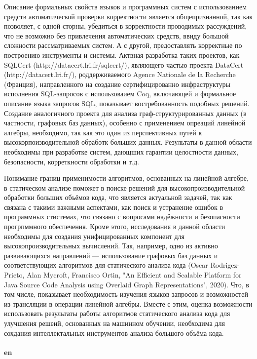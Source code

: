 \documentclass[12pt]{article}  %
\theoremstyle{remark}
\begin{document}
Описание формальных свойств языков и программных систем с использованием средств автоматической проверки корректности является общепризнанной, так как позволяет, с одной сторны, убедиться в корректности проводимых рассуждений, что не возможно без привлечения автоматических средств, ввиду большой сложности рассматриваемых систем. А с другой, предоставлять корректные по построению инструменты и системы. Актвная разработка таких проектов, как SQLCert (http://datacert.lri.fr/sqlcert/), являющего частью проекта DataCert (http://datacert.lri.fr/), роддерживаемого Agence Nationale de la Recherche (Франция), направленного на создание сертифицированно инфраструктуры исполнения SQL-запросов с использоваием Coq, включающей и формальное описание языка запросов SQL, показывает востребованность подобных решений. Создание аналогичного проекта для анализа граф-структурированных данных (в частности, графовых баз данных), особенно с применением опреаций линейной алгебры, необходимо, так как это один из перспективных путей к высокорпоизводительной обработк больших данных.
Результаты в данной области необходимы при разработке систем, дающших гарантии целостности данных, безопасности, корреткности обработки и т.д.

Понимание границ применимости алгоритмов, основанных на линейной алгебре, в статическом анализе поможет в поиске решений для высокопроизводительной обработки больших объёмов кода, что является актуальной задачей, так как связана с такими важными аспектами, как поиск и устранение ошибок в программных стистемах, что связано с вопросами надёжности и безопасности прогрпммного обеспечения. Кроме этого, исследования в данной области необходимы для создания унифицированных компонент для высокопроизводительных вычислений. Так, например, одно из активно развивающихся направлений --- использование графовых баз данных и соответствующих алгоритмов для статического анализа кода (Oscar Rodrigez-Prieto, Alan Mycroft, Francisco Ortin, "An Efficient and Scalable Platform for Java Source Code Analysis using Overlaid Graph Representations", 2020). Что, в том числе, показывает необходимость изучения языков запросов и возможностей из трансляции в операции линейной алгебры.
Вместе с этим, оценка возможности использовать результаты работы алгоритмов статического анализа кода для улучшения решеий, основанных на машинном обучении, необходима для сохдания интеллектальных инструментов анализа большого объёма кода.
\\
\\
\textbf{en}\\
\end{document}
